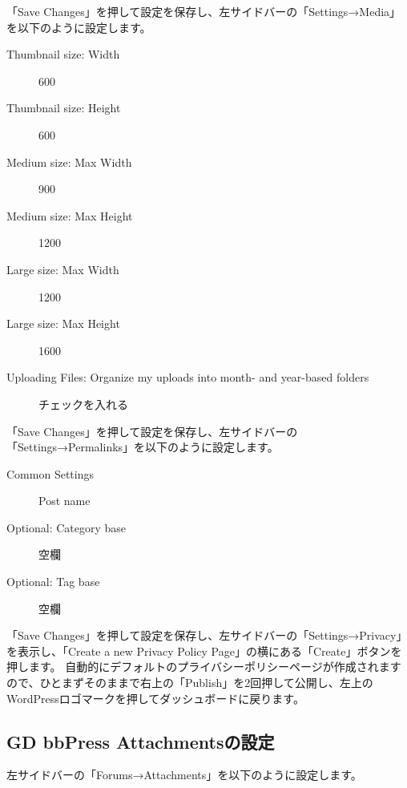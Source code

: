 \documentclass[titlepage,10pt,a4paper,uplatex]{jsbook}
\begin{document}
「Save Changes」を押して設定を保存し、左サイドバーの「Settings→Media」を以下のように設定します。

\begin{description}
\item[Thumbnail size: Width] 600
\item[Thumbnail size: Height] 600
\item[Medium size: Max Width] 900
\item[Medium size: Max Height] 1200
\item[Large size: Max Width] 1200
\item[Large size: Max Height] 1600
\item[Uploading Files: Organize my uploads into month- and year-based folders] チェックを入れる
\end{description}

「Save Changes」を押して設定を保存し、左サイドバーの「Settings→Permalinks」を以下のように設定します。

\begin{description}
\item[Common Settings] Post name
\item[Optional: Category base] 空欄
\item[Optional: Tag base] 空欄
\end{description}

「Save Changes」を押して設定を保存し、左サイドバーの「Settings→Privacy」を表示し、「Create a new Privacy Policy Page」の横にある「Create」ボタンを押します。
自動的にデフォルトのプライバシーポリシーページが作成されますので、ひとまずそのままで右上の「Publish」を2回押して公開し、左上のWordPressロゴマークを押してダッシュボードに戻ります。

\subsection{GD bbPress Attachmentsの設定}

左サイドバーの「Forums→Attachments」を以下のように設定します。
\end{document}
